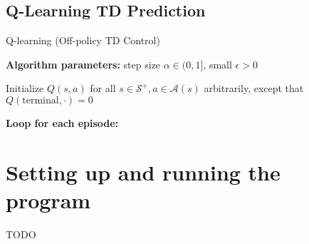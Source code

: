 \section{Q-Learning TD Prediction}
\begin{algorithm}[h!]
    \caption{Q-learning (Off-policy TD Control)}
    \label{alg:q_learning}

    \textbf{Algorithm parameters:} step size $\alpha \in (0, 1]$, small $\epsilon > 0$

    Initialize $Q(s, a)$ for all $s \in \mathcal{S}^+, a \in \mathcal{A}(s)$ arbitrarily, except that $Q(\text{terminal}, \cdot) = 0$

    \textbf{Loop for each episode:}
\end{algorithm}


\chapter{Setting up and running the program}
TODO
